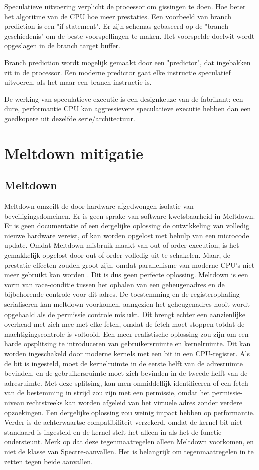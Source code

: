 Speculatieve uitvoering verplicht de processor om gissingen te doen. Hoe beter het algoritme van de CPU hoe meer prestaties. Een voorbeeld van branch prediction is een "if statement". 
\parencite{Kocher}
Er zijn schemas gebaseerd op de "branch geschiedenis" om de beste voorspellingen te maken. Het voorspelde doelwit wordt opgeslagen in de branch target buffer.

Branch prediction wordt mogelijk gemaakt door een "predictor", dat ingebakken zit in de processor.
Een moderne predictor gaat elke instructie speculatief uitvoeren, als het maar een branch instructie is.

De werking van speculatieve executie is een designkeuze van de fabrikant: een dure, performantie CPU kan aggressievere speculatieve executie hebben dan een goedkopere uit dezelfde serie/architectuur.

\section{Meltdown mitigatie}
\subsection{Meltdown}
Meltdown omzeilt de door hardware afgedwongen isolatie van
beveiligingsdomeinen. Er is geen sprake van software-kwetsbaarheid
in Meltdown. Er is geen documentatie
of een dergelijke oplossing de ontwikkeling van volledig
nieuwe hardware vereist, of kan worden opgelost met behulp van een microcode
update.
Omdat Meltdown misbruik maakt van out-of-order execution, is het gemakkelijk opgelost
door out of-order volledig uit te schakelen. Maar, de prestatie-effecten
zouden groot zijn, omdat parallellisme van moderne CPU's
niet meer gebruikt kan worden . Dit is dus geen perfecte
oplossing.
Meltdown is een vorm van race-conditie tussen het
ophalen van een geheugenadres en de bijbehorende controle voor dit adres. De toestemming en de registerophaling serialiseren
 kan meltdown voorkomen,
aangezien het geheugenadres nooit wordt opgehaald als de permissie
controle mislukt. Dit brengt echter een aanzienlijke overhead met zich mee
met elke fetch, omdat de fetch moet stoppen
totdat de machtigingscontrole is voltooid.
Een meer realistische oplossing zou zijn om een ​harde opsplitsing te introduceren
van gebruikersruimte en kernelruimte. Dit kan worden ingeschakeld
 door moderne kernels met een
bit in een CPU-register. Als de
bit is ingesteld, moet de kernelruimte in de eerste helft 
van de adresruimte bevinden, en de gebruikersruimte moet zich bevinden in 
de tweede helft van de adresruimte. Met deze splitsing, kan men onmiddellijk identificeren of een
fetch van de bestemming in strijd zou zijn met een permissie,
omdat het permissie-niveau rechtstreeks kan worden afgeleid van
het virtuele adres zonder verdere opzoekingen. Een dergelijke oplossing zou weinig impact hebben op performantie. Verder is de achterwaartse compatibiliteit
verzekerd, omdat de kernel-bit niet standaard is ingesteld en
de kernel stelt het alleen in als het de functie ondersteunt.
Merk op dat deze tegenmaatregelen alleen Meltdown voorkomen,
en niet de klasse van Spectre-aanvallen. 
Het is belangrijk om tegenmaatregelen in te zetten
tegen beide aanvallen.




